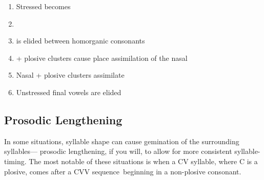 \begin{enumerate}
  \item {
    Stressed  becomes 

    }
  \item {}
  \item {
     is elided between homorganic consonants

    }
    \item {
       + plosive clusters cause place assimilation of the nasal

  }
    \item {
      Nasal + plosive clusters assimilate

  }

  \item {
      Unstressed final vowels are elided

  }


\end{enumerate}

\subsection{Prosodic Lengthening}\label{sec:phono-allo-lengthening}
In some situations, syllable shape can cause gemination of the surrounding syllables--- prosodic lengthening, if you will, to allow for more consistent syllable-timing. The most notable of these situations is when a CV syllable, where C is a plosive, comes after a CVV sequence\footnotemark\ beginning in a non-plosive consonant.


